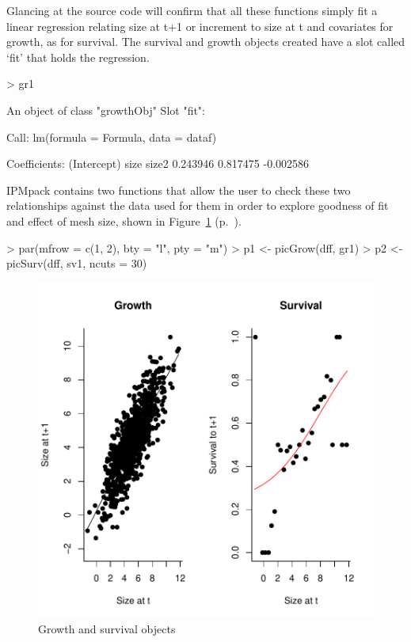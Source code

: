 \documentclass{article}
\begin{document}
Glancing at the source code will confirm that all these functions simply fit a linear regression relating size at t+1 or increment to size at t and covariates for growth, as for survival. The survival and growth objects created have a slot called `fit' that holds the regression.
\begin{Schunk}
\begin{Sinput}
> gr1
\end{Sinput}
\begin{Soutput}
An object of class "growthObj"
Slot "fit":

Call:
lm(formula = Formula, data = dataf)

Coefficients:
(Intercept)         size        size2  
   0.243946     0.817475    -0.002586  
\end{Soutput}
\end{Schunk}
IPMpack contains two functions that allow the user to check these two relationships against the data used for them in order to explore goodness of fit and effect of mesh size, shown in Figure~\ref{fig:one} (p.~\pageref{fig:one}).
\begin{Schunk}
\begin{Sinput}
> par(mfrow = c(1, 2), bty = "l", pty = "m")
> p1 <- picGrow(dff, gr1)
> p2 <- picSurv(dff, sv1, ncuts = 30)
\end{Sinput}
\end{Schunk}
\begin{figure}
\begin{center}
\includegraphics{IPMpack_Vignette-fig1}
\end{center}
\caption{Growth and survival objects}
\label{fig:one}
\end{figure}
\end{document}
